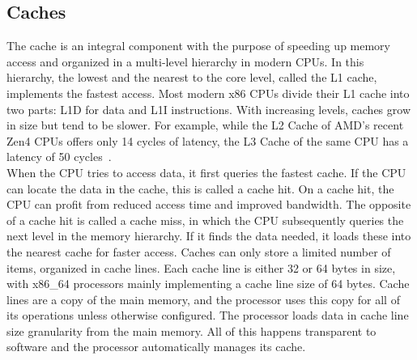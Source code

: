 \subsection{Caches}
\label{sec:state:technical:caches}


The cache is an integral component with the purpose of speeding up memory access
and organized in a multi-level hierarchy in modern CPUs. In this hierarchy, the
lowest and the nearest to the core level, called the L1 cache, implements the
fastest access. Most modern x86 CPUs divide their L1 cache into two parts: L1D
for data and L1I instructions. With increasing levels, caches grow in size but
tend to be slower. For example, while the L2 Cache of AMD's recent Zen4 CPUs
offers only 14 cycles of latency, the L3 Cache of the same CPU has a latency of
50 cycles~\cite{zen4}.\\

When the CPU tries to access data, it first queries the fastest cache. If the
CPU can locate the data in the cache, this is called a cache hit. On a cache
hit, the CPU can profit from reduced access time and improved bandwidth. The
opposite of a cache hit is called a cache miss, in which the CPU subsequently
queries the next level in the memory hierarchy. If it finds the data needed, it
loads these into the nearest cache for faster access. Caches can only store a
limited number of items, organized in cache lines. Each cache line is either 32
or 64 bytes in size, with x86\_64 processors mainly implementing a cache line
size of 64 bytes. Cache lines are a copy of the main memory, and the processor
uses this copy for all of its operations unless otherwise configured. The
processor loads data in cache line size granularity from the main memory. All of
this happens transparent to software and the processor automatically manages its
cache. \\


